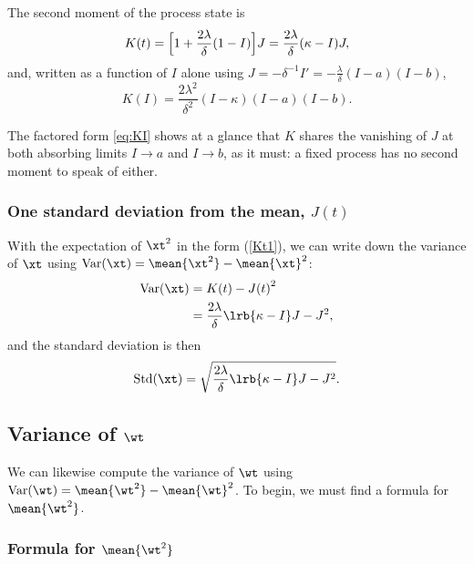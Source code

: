 \begin{theorem}
\label{thm:K}
The second moment of the process state is
\begin{equation}
\label{eq:Kclosedform}
K(t)=\Bigl[1+\frac{2\lambda}{\delta}(1-I)\Bigr]J
=\frac{2\lambda}{\delta}(\kappa-I)J,
\end{equation}
and, written as a function of $I$ alone using
$J=-\delta^{-1}I'=-\frac{\lambda}{\delta}(I-a)(I-b)$,
\begin{equation}
\label{eq:KI}
K(I) = \frac{2\lambda^2}{\delta^2}(I-\kappa)(I-a)(I-b).
\end{equation}
\end{theorem}

The factored form \eqref{eq:KI} shows at a glance that $K$ shares the
vanishing of $J$ at both absorbing limits $I\to a$ and $I\to b$, as it must:
a fixed process has no second moment to speak of either.

\subsubsection{One standard deviation from the mean, $J(t)$}

With the expectation of $\xt^2$ in the form (\ref{Kt1}), we can write down the
variance of $\xt$ using $\text{Var}(\xt) = \mean{\xt^2} - \mean{\xt}^2$:
\begin{align*}
\text{Var}(\xt) &= K(t) - {J(t)}^2\\
&= \frac{2\lambda}{\delta}\lrb{\kappa - I}J - J^2,
\end{align*}
and the standard deviation is then
\begin{equation*}
\text{Std}(\xt) = \sqrt{\frac{2\lambda}{\delta}\lrb{\kappa- I}J - J^2}.
\end{equation*}

\subsection{Variance of $\wt$}

We can likewise compute the variance of $\wt$ using
$\text{Var}(\wt) = \mean{\wt^2} - \mean{\wt}^2$. To begin, we must find a
formula for $\mean{\wt^2}$.

\subsubsection{Formula for $\mean{\wt^2}$}

